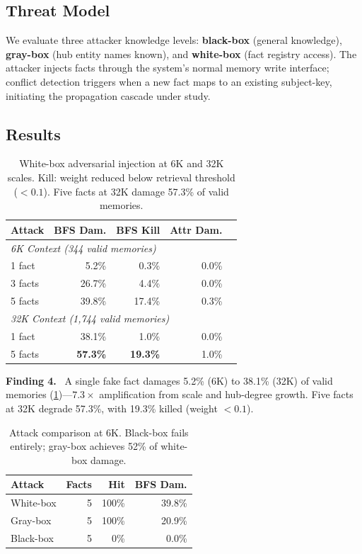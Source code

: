 \documentclass{article}
\newcommand{\finding}[1]{\vspace{2pt}\noindent\textbf{Finding #1.}~}
\begin{document}
\subsection{Threat Model}

We evaluate three attacker knowledge levels: \textbf{black-box} (general knowledge), \textbf{gray-box} (hub entity names known), and \textbf{white-box} (fact registry access).
The attacker injects facts through the system's normal memory write interface; conflict detection triggers when a new fact maps to an existing subject-key, initiating the propagation cascade under study.

\subsection{Results}

\begin{table}[htbp]
\centering
\footnotesize
\begin{tabular}{lrrrr}
\toprule
\textbf{Attack} & \textbf{BFS Dam.} & \textbf{BFS Kill} & \textbf{Attr Dam.} \\
\midrule
\multicolumn{4}{l}{\textit{6K Context (344 valid memories)}} \\
1 fact & 5.2\% & 0.3\% & 0.0\% \\
3 facts & 26.7\% & 4.4\% & 0.0\% \\
5 facts & 39.8\% & 17.4\% & 0.3\% \\
\midrule
\multicolumn{4}{l}{\textit{32K Context (1,744 valid memories)}} \\
1 fact & 38.1\% & 1.0\% & 0.0\% \\
5 facts & \textbf{57.3\%} & \textbf{19.3\%} & 1.0\% \\
\bottomrule
\end{tabular}
\caption{White-box adversarial injection at 6K and 32K scales. Kill: weight reduced below retrieval threshold ($< 0.1$). Five facts at 32K damage 57.3\% of valid memories.}
\label{tab:adversarial}
\end{table}

\finding{4} A single fake fact damages 5.2\% (6K) to 38.1\% (32K) of valid memories (\cref{tab:adversarial})---$7.3\times$ amplification from scale and hub-degree growth.
Five facts at 32K degrade 57.3\%, with 19.3\% killed (weight $< 0.1$).

\begin{table}[htbp]
\centering
\footnotesize
\begin{tabular}{lrrr}
\toprule
\textbf{Attack} & \textbf{Facts} & \textbf{Hit} & \textbf{BFS Dam.} \\
\midrule
White-box & 5 & 100\% & 39.8\% \\
Gray-box & 5 & 100\% & 20.9\% \\
Black-box & 5 & 0\% & 0.0\% \\
\bottomrule
\end{tabular}
\caption{Attack comparison at 6K. Black-box fails entirely; gray-box achieves 52\% of white-box damage.}
\label{tab:blackbox}
\end{table}
\end{document}
